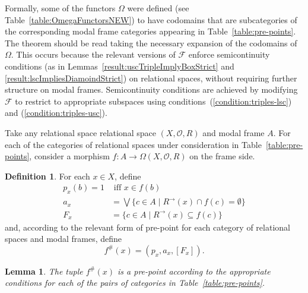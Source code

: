 \documentclass{article}[a4paper]
\newtheorem{lemma}{Lemma}%
\theoremstyle{definition}
\newtheorem{definition}{Definition}%
\newcommand{\Fcal}{\mathcal{F}} %
\newcommand{\Ocal}{\mathcal{O}} %
\newcommand{\dirim}{^{\rightarrow\!}}
\newcommand{\hash}{{\#}}
\begin{document}
Formally, some of the functors $\Omega$ were defined (see Table~\ref{table:OmegaFunctorsNEW}) to have codomains that are subcategories of the corresponding modal frame categories appearing in Table~\ref{table:pre-points}. The theorem should be read taking the necessary expansion of the codomains of $\Omega$. This occurs because the relevant versions of $\Fcal$ enforce semicontinuity conditions (as in Lemmas~\ref{result:uscTripleImplyBoxStrict} and \ref{result:lscImpliesDiamoindStrict}) on relational spaces, without requiring further structure on modal frames. Semicontinuity conditions are achieved by modifying $\Fcal$ to restrict to appropriate subspaces using conditions~(\ref{condition:triples-lsc}) and (\ref{condition:triples-usc}).

Take any relational space relational space $(X,\mathcal{O},R)$ and modal frame $A$. For each of the categories of relational spaces under consideration in Table~\ref{table:pre-points}, consider a morphism $f:A \longrightarrow \Omega (X, \Ocal , R)$ on the frame side. 


\begin{definition} 
For each $x \in X$, define  
    \begin{align}
    p_x (b) = 1 &\mbox{ iff }  x \in f(b)\\
    a_x &= \bigvee \{ c \in A \mid R\dirim(x) \cap f(c) =\emptyset \} \\
    F_x &= \{ c \in A \mid R\dirim(x) \subseteq f(c) \}
    \end{align}
and, according to the relevant form of pre-point for each category of relational spaces and modal frames, define 
\begin{equation}
\label{definition:fhashTriple}
f^\hash (x) = (p_x , a_x, [F_x]) .
\end{equation}
\end{definition}

\begin{lemma}
The tuple $f^\hash (x)$ is a pre-point according to the appropriate conditions for each of the pairs of categories in Table~\ref{table:pre-points}.
\end{lemma}
\end{document}
